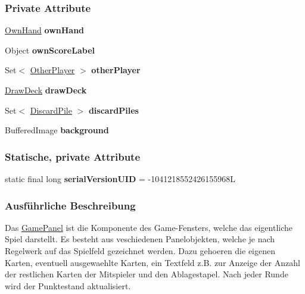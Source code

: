 \subsubsection*{Private Attribute}
\begin{DoxyCompactItemize}
\item 
\hypertarget{a00013_abc2b86a848d138a9fa440633697d91fe}{\hyperlink{a00019}{Own\-Hand} {\bfseries own\-Hand}}\label{a00013_abc2b86a848d138a9fa440633697d91fe}

\item 
\hypertarget{a00013_ac1d053a82e4efcc49e4817315dfb282e}{Object {\bfseries own\-Score\-Label}}\label{a00013_ac1d053a82e4efcc49e4817315dfb282e}

\item 
\hypertarget{a00013_a5900859081242fdd5b35a0165e3aed66}{Set$<$ \hyperlink{a00018}{Other\-Player} $>$ {\bfseries other\-Player}}\label{a00013_a5900859081242fdd5b35a0165e3aed66}

\item 
\hypertarget{a00013_a25b0a421eff1aa5441292abae419e594}{\hyperlink{a00010}{Draw\-Deck} {\bfseries draw\-Deck}}\label{a00013_a25b0a421eff1aa5441292abae419e594}

\item 
\hypertarget{a00013_a0c36411186948010cb7232fb7ef099c4}{Set$<$ \hyperlink{a00009}{Discard\-Pile} $>$ {\bfseries discard\-Piles}}\label{a00013_a0c36411186948010cb7232fb7ef099c4}

\item 
\hypertarget{a00013_a714354485419fb2b615f17fcce85657e}{Buffered\-Image {\bfseries background}}\label{a00013_a714354485419fb2b615f17fcce85657e}

\end{DoxyCompactItemize}
\subsubsection*{Statische, private Attribute}
\begin{DoxyCompactItemize}
\item 
\hypertarget{a00013_a3238d314ecdee14d2966760945d00c3b}{static final long {\bfseries serial\-Version\-U\-I\-D} = -\/1041218552426155968\-L}\label{a00013_a3238d314ecdee14d2966760945d00c3b}

\end{DoxyCompactItemize}


\subsubsection{Ausführliche Beschreibung}
Das \hyperlink{a00013}{Game\-Panel} ist die Komponente des Game-\/\-Fensters, welche das eigentliche Spiel darstellt. Es besteht aus veschiedenen Panelobjekten, welche je nach Regelwerk auf das Spielfeld gezeichnet werden. Dazu gehoeren die eigenen Karten, eventuell ausgewaehlte Karten, ein Textfeld z.\-B. zur Anzeige der Anzahl der restlichen Karten der Mitspieler und den Ablagestapel. Nach jeder Runde wird der Punktestand aktualisiert. 